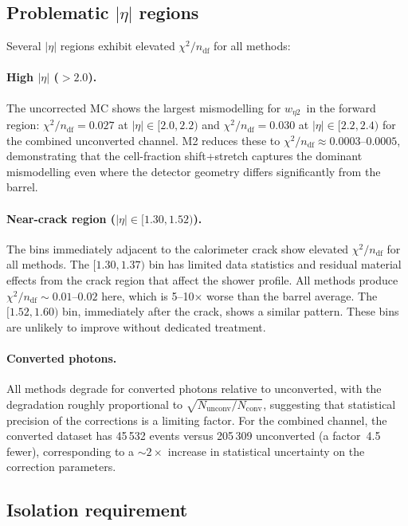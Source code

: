 \documentclass[11pt,a4paper]{article}
\newcommand{\weta}{\ensuremath{w_{\eta 2}}}
\newcommand{\abseta}{\ensuremath{|\eta|}}
\newcommand{\chisq}{\ensuremath{\chi^2 / n_{\mathrm{df}}}}
\begin{document}
\subsection{Problematic \texorpdfstring{$\abseta$}{|eta|} regions}
\label{sec:disc-problematic}

Several $\abseta$ regions exhibit elevated $\chisq$ for all methods:

\paragraph{High $\abseta$ ($> 2.0$).}
The uncorrected MC shows the largest mismodelling for \weta\ in the
forward region: $\chisq = 0.027$ at $\abseta \in [2.0, 2.2)$ and
$\chisq = 0.030$ at $\abseta \in [2.2, 2.4)$ for the combined
unconverted channel.  M2 reduces these to
$\chisq \approx 0.0003$--$0.0005$, demonstrating that the cell-fraction
shift+stretch captures the dominant mismodelling even where the detector
geometry differs significantly from the barrel.

\paragraph{Near-crack region ($\abseta \in [1.30, 1.52)$).}
The bins immediately adjacent to the calorimeter crack show elevated
$\chisq$ for all methods.  The $[1.30, 1.37)$ bin has limited data
statistics and residual material effects from the crack region that
affect the shower profile.  All methods produce $\chisq \sim
0.01$--$0.02$ here, which is 5--10$\times$ worse than the barrel
average.  The $[1.52, 1.60)$ bin, immediately after the crack, shows
a similar pattern.  These bins are unlikely to improve without dedicated
treatment.

\paragraph{Converted photons.}
All methods degrade for converted photons relative to unconverted, with
the degradation roughly proportional to $\sqrt{N_{\text{unconv}} /
N_{\text{conv}}}$, suggesting that statistical precision of the
corrections is a limiting factor.  For the combined channel, the
converted dataset has 45\,532 events versus 205\,309 unconverted (a
factor~4.5 fewer), corresponding to a $\sim$$2\times$ increase in
statistical uncertainty on the correction parameters.


\subsection{Isolation requirement}
\label{sec:disc-iso}
\end{document}
